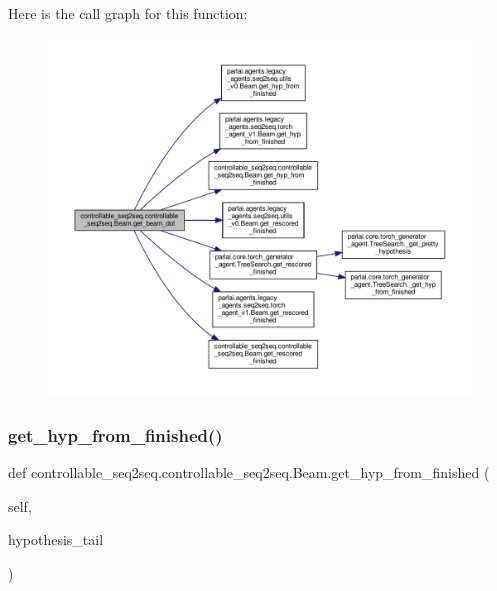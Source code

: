 Here is the call graph for this function\+:
\nopagebreak
\begin{figure}[H]
\begin{center}
\leavevmode
\includegraphics[width=350pt]{classcontrollable__seq2seq_1_1controllable__seq2seq_1_1Beam_a4d1acfa68e54ee73cc7fbcb7f334bf99_cgraph}
\end{center}
\end{figure}
\mbox{\label{classcontrollable__seq2seq_1_1controllable__seq2seq_1_1Beam_ab4532f62a0428f5581680c9915b9c95e}} 
\subsubsection{\texorpdfstring{get\+\_\+hyp\+\_\+from\+\_\+finished()}{get\_hyp\_from\_finished()}}
{\footnotesize\ttfamily def controllable\+\_\+seq2seq.\+controllable\+\_\+seq2seq.\+Beam.\+get\+\_\+hyp\+\_\+from\+\_\+finished (\begin{DoxyParamCaption}\item[{}]{self,  }\item[{}]{hypothesis\+\_\+tail }\end{DoxyParamCaption})}

